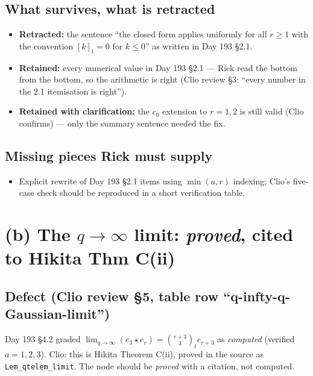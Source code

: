 \documentclass[11pt]{article}
\theoremstyle{definition}
\newcommand{\qi}[1]{[#1]_t}
\begin{document}
\subsection*{What survives, what is retracted}
\begin{itemize}[leftmargin=1.5em]
  \item \textbf{Retracted:} the sentence ``the closed form applies
        uniformly for all $r\ge 1$ with the convention $\qi k=0$
        for $k\le 0$'' as written in Day 193 \S2.1.
  \item \textbf{Retained:} every numerical value in Day 193 \S2.1
        --- Rick read the bottom from the bottom, so the arithmetic is
        right (Clio review \S3: ``every number in the 2.1 itemisation
        is right'').
  \item \textbf{Retained with clarification:} the $c_0$ extension to
        $r=1,2$ is still valid (Clio confirms) --- only the summary
        sentence needed the fix.
\end{itemize}

\subsection*{Missing pieces Rick must supply}
\begin{itemize}[leftmargin=1.5em]
  \item Explicit rewrite of Day 193 \S2.1 items using $\min(a,r)$
        indexing; Clio's five-case check should be reproduced in a
        short verification table.
\end{itemize}

\section{(b) The $q\to\infty$ limit: \emph{proved}, cited to Hikita Thm C(ii)}
\label{sec:qinfty}

\subsection*{Defect (Clio review \S5, table row ``q-infty-q-Gaussian-limit'')}
Day 193 \S4.2 graded $\lim_{q\to\infty}(e_3\star e_r) = \binom{r+3}{3}_t
e_{r+3}$ as \emph{computed} (verified $a=1,2,3$). Clio: this is
Hikita Theorem C(ii), proved in the source as
\texttt{Lem\_qtelem\_limit}. The node should be \emph{proved}
with a citation, not computed.
\end{document}

